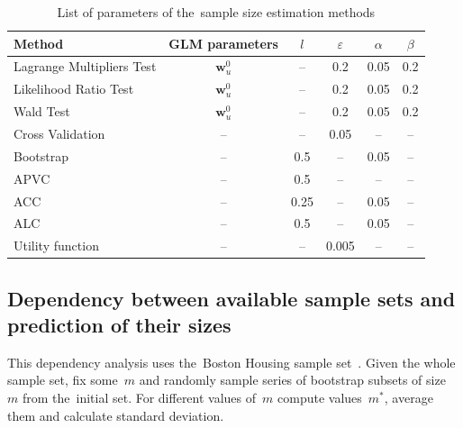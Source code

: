\documentclass[
11pt,%
tightenlines,%
twoside,%
onecolumn,%
nofloats,%
nobibnotes,%
nofootinbib,%
superscriptaddress,%
noshowpacs,%
centertags]%
{revtex4}
\begin{document}
\begin{table}[h!]
\begin{center}
\caption{List of parameters of the~sample size estimation methods}
\label{table3}
\begin{tabular}{l|c|c|c|c|c}
\hline 
Method& GLM parameters& $l$& $\varepsilon$	& $\alpha$& $\beta$\\ 
\hline	
Lagrange	Multipliers Test	& $\mathbf{w}_{u}^0$	& -- & 0.2& 0.05& 0.2\\
\hline	
Likelihood Ratio Test			& $\mathbf{w}_{u}^0$	& -- & 0.2& 0.05& 0.2\\
\hline	
Wald	Test							& $\mathbf{w}_{u}^0$	& -- & 0.2& 0.05& 0.2\\
\hline	
Cross Validation 				& -- & -- 	& 0.05& -- & --\\
\hline	
Bootstrap 							& -- & 0.5	& -- & 0.05& --\\
\hline	
APVC 									& -- & 0.5	& -- & -- & --\\
\hline	
ACC 									& -- & 0.25	& -- & 0.05& --\\
\hline	
ALC 										& -- & 0.5	& -- & 0.05& --\\
\hline	
Utility function 					& -- & -- 	& 0.005& -- & --\\
\hline
\end{tabular}
\end{center}
\end{table}

\subsection{Dependency between available sample sets and prediction of their sizes}
This dependency analysis uses the~Boston Housing sample set~\cite{boston}. Given the whole sample set, fix some~$m$ and randomly sample series of bootstrap subsets of size~$m$ from the~initial set. For different values of~$m$ compute values~$m^*$, average them and calculate standard deviation. 
 
\end{document}
